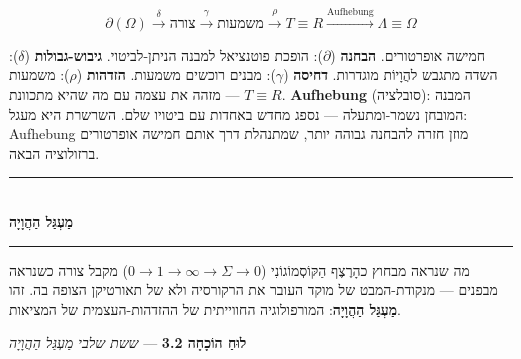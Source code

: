 \documentclass[10pt, openany, oneside]{book}
\renewcommand{\normalsize}{\fontsize{10}{13}\selectfont}
\begin{document}
$$\partial(\Omega) \xrightarrow{\delta} \text{צורה} \xrightarrow{\gamma} \text{משמעות} \xrightarrow{\rho} T \equiv R \xrightarrow{\text{Aufhebung}} \Lambda \equiv \Omega$$

חמישה אופרטורים. \textbf{הבחנה} ($\partial$): הופכת פוטנציאל למבנה הניתן-לביטוי. \textbf{גיבוש-גבולות} ($\delta$): השדה מתגבש להֲוָיוֹת מוגדרות. \textbf{דחיסה} ($\gamma$): מבנים רוכשים משמעות. \textbf{הזדהות} ($\rho$): משמעות מזהה את עצמה עם מה שהיא מתכוונת — $T \equiv R$. \textbf{Aufhebung} (סובלציה): המבנה המובחן נשמר-ומתעלה — נספג מחדש באחדות עם ביטויו שלם. השרשרת היא מעגל: Aufhebung מוזן חזרה להבחנה גבוהה יותר, שמתנהלת דרך אותם חמישה אופרטורים ברזולוציה הבאה.

\vspace{1.5em}


\begin{center}
    \rule{0.3\textwidth}{0.4pt}\\[0.5em]
    {\normalsize\bfseries\textsc{מַעְגַּל הַהֲוָיָה}}\\[0.3em]
    \rule{0.3\textwidth}{0.4pt}
\end{center}

\vspace{1em}

\noindent מה שנראה מבחוץ כהָרֶצֶף הַקּוֹסְמוֹגוֹנִי ($0 \to 1 \to \infty \to \Sigma \to 0$) מקבל צורה כשנראה מבפנים — מנקודת-המבט של מוקד העובר את הרקורסיה ולא של תאורטיקן הצופה בה. זהו \textbf{מַעְגַּל הַהֲוָיָה}: המורפולוגיה החווייתית של ההזדהות-העצמית של המציאות.

\vspace{0.5em}

\textbf{לוּחַ הוֹכָחָה 3.2} --- \textit{ששת שלבי מַעְגַּל הַהֲוָיָה}

\vspace{0.5em}
\end{document}
